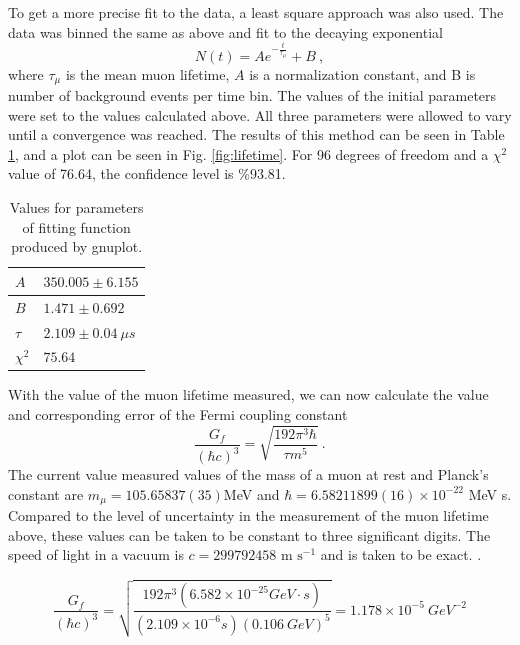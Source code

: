 \documentclass[12pt]{article}
\begin{document}
\noindent
To get a more precise fit to the data, a least square approach was also used. The data was binned the same as above and fit to the decaying exponential
\begin{equation}
N(t) = Ae^{-\frac{t}{\tau_{\mu}}} + B\:,
\end{equation} 
where $\tau_{\mu}$ is the mean muon lifetime, $A$ is a normalization constant, and B is number of background events per time bin. The values of the initial parameters were set to the values calculated above. All three parameters were allowed to vary until a convergence was reached. The results of this method can be seen in Table \ref{tab:gnutab}, and a plot can be seen in Fig. \ref{fig:lifetime}. For 96 degrees of freedom and a $\chi^2$ value of 76.64, the confidence level is \%93.81.
\begin{table}[h!]\centering
\begin{tabular}{ |p{0.5cm}|p{4cm}|}
 \hline
$A$ & \qquad $350.005 \pm 6.155$\\
\hline
 $B$ & \qquad $1.471 \pm 0.692$ \\
 \hline
 $\tau$ & \qquad $2.109 \pm 0.04\:\mu s$\\
 \hline
 $\chi^2$ & \qquad $75.64$\\
 \hline
\end{tabular}
\def\sym#1{\ifmmode^{#1}\else\(^{#1}\)\fi}
\caption{Values for parameters of fitting function produced by gnuplot.}
\label{tab:gnutab}
\end{table}

\newpage
With the value of the muon lifetime measured, we can now calculate the value and corresponding error of the Fermi coupling constant  
\begin{equation}
\frac{G_f}{(\hbar c)^3} = \sqrt{\frac{192\pi^3\hbar}{\tau m^5}}\:.
\end{equation}
The current value measured values of the mass of a muon at rest and Planck's constant are $m_{\mu} = 105.65837(35)$MeV and $\hbar = 6.58211899(16)\times 10^{-22}$ MeV s. Compared to the level of uncertainty in the measurement of the muon lifetime above, these values can be taken to be constant to three significant digits. The speed of light in a vacuum is $c = 299792458 \text{ m s}^{-1}$ and is taken to be exact. \cite{pdg, pdg2, nist}.

\begin{equation}
\frac{G_f}{(\hbar c)^3} = \sqrt{\frac{192\pi^3(6.582\times 10^{-25}GeV\cdot s)}{(2.109\times 10^{-6}s)(0.106\:GeV)^5}} = 1.178 \times 10^{-5}\: GeV^{-2} 
\end{equation}
\end{document}
